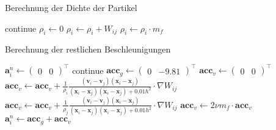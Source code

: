\documentclass{scrreprt}
\begin{document}
\begin{algorithm}
\caption{Berechnung der Dichte der Partikel}
\label{alg:dichte}
\begin{algorithmic}
            \STATE continue
        \ENDIF
        \STATE $\rho_i \gets 0$
            \STATE $\rho_i \gets \rho_i + W_{ij}$
        \ENDFOR
        \STATE $\rho_i \gets \rho_i \cdot m_f$
    \ENDFOR
\end{algorithmic}
\end{algorithm}

\begin{algorithm}
\caption{Berechnung der restlichen Beschleunigungen}
\label{alg:restliche_beschleunigung}
\begin{algorithmic}
        \STATE $\textbf{a}_i^n \gets \begin{pmatrix}0 & 0 \end{pmatrix}^\intercal$
        \STATE continue
    \ENDIF
    \STATE $\textbf{acc}_g \gets \begin{pmatrix}0 &-9.81 \end{pmatrix}^\intercal$
    \STATE $\textbf{acc}_v \gets \begin{pmatrix}0 & 0 \end{pmatrix}^\intercal$
    \STATE
    \STATE {}
            \STATE $\textbf{acc}_v \gets \textbf{acc}_v + \frac{1}{\rho_i} \frac{(\textbf{v}_i - \textbf{v}_j)(\textbf{x}_i - \textbf{x}_j)}{(\textbf{x}_i - \textbf{x}_j)(\textbf{x}_i - \textbf{x}_j) + 0.01h^2} \cdot \nabla W_{ij}$
        \ELSE
            \STATE $\textbf{acc}_v \gets \textbf{acc}_v + \frac{1}{\rho_j} \frac{(\textbf{v}_i - \textbf{v}_j)(\textbf{x}_i - \textbf{x}_j)}{(\textbf{x}_i - \textbf{x}_j)(\textbf{x}_i - \textbf{x}_j) + 0.01h^2} \cdot \nabla W_{ij}$
        \ENDIF
    \ENDFOR
    \STATE $\textbf{acc}_v \gets 2\nu m_f \cdot \textbf{acc}_v$
    \STATE
    \STATE $\textbf{a}_i^n \gets \textbf{acc}_g + \textbf{acc}_v$
\ENDFOR
\end{algorithmic}
\end{algorithm}
\end{document}
